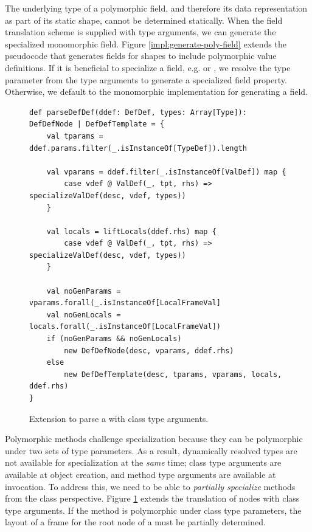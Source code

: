 The underlying type of a polymorphic field, and therefore its data representation as part of its static shape, cannot be determined statically.
When the field translation scheme is supplied with type arguments, we can generate the specialized monomorphic field.
Figure \ref{impl:generate-poly-field} extends the pseudocode that generates fields for shapes to include polymorphic value definitions.
If it is beneficial to specialize a field, e.g.  or , we resolve the type parameter from the type arguments to generate a specialized field property.
Otherwise, we default to the monomorphic implementation for generating a field.

\begin{figure}[!htb]
\begin{verbatim}
def parseDefDef(ddef: DefDef, types: Array[Type]): DefDefNode | DefDefTemplate = {
	val tparams = ddef.params.filter(_.isInstanceOf[TypeDef]).length
	
	val vparams = ddef.filter(_.isInstanceOf[ValDef]) map {
		case vdef @ ValDef(_, tpt, rhs) => specializeValDef(desc, vdef, types))
	}

	val locals = liftLocals(ddef.rhs) map {
		case vdef @ ValDef(_, tpt, rhs) => specializeValDef(desc, vdef, types))
	}
	
	val noGenParams = vparams.forall(_.isInstanceOf[LocalFrameVal]
	val noGenLocals = locals.forall(_.isInstanceOf[LocalFrameVal])
	if (noGenParams && noGenLocals)
		new DefDefNode(desc, vparams, ddef.rhs)
	else 
		new DefDefTemplate(desc, tparams, vparams, locals, ddef.rhs)
}
\end{verbatim}
\caption{Extension to parse a  with class type arguments.}
\label{impl:parse-poly-defdef-cls}
\end{figure}

Polymorphic methods challenge specialization because they can be polymorphic under two sets of type parameters.
As a result, dynamically resolved types are not available for specialization at the \textit{same} time; class type arguments are available at object creation, and method type arguments are available at invocation.
To address this, we need to be able to \textit{partially specialize} methods from the class perspective.
Figure \ref{impl:parse-poly-defdef-cls} extends the translation of  nodes with class type arguments.
If the method is polymorphic under class type parameters, the layout of a frame for the root node of a  must be partially determined.

